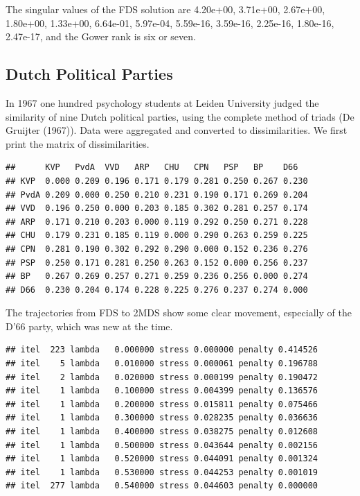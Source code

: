 \documentclass[
  12pt,
]{article}
\begin{document}
The singular values of the FDS solution are 4.20e+00, 3.71e+00,
2.67e+00, 1.80e+00, 1.33e+00, 6.64e-01, 5.97e-04, 5.59e-16, 3.59e-16,
2.25e-16, 1.80e-16, 2.47e-17, and the Gower rank is six or seven.

\hypertarget{dutch-political-parties}{%
\subsection{Dutch Political Parties}\label{dutch-political-parties}}

In 1967 one hundred psychology students at Leiden University judged the
similarity of nine Dutch political parties, using the complete method of
triads (De Gruijter (1967)). Data were aggregated and converted to
dissimilarities. We first print the matrix of dissimilarities.

\begin{verbatim}
##      KVP   PvdA  VVD   ARP   CHU   CPN   PSP   BP    D66  
## KVP  0.000 0.209 0.196 0.171 0.179 0.281 0.250 0.267 0.230
## PvdA 0.209 0.000 0.250 0.210 0.231 0.190 0.171 0.269 0.204
## VVD  0.196 0.250 0.000 0.203 0.185 0.302 0.281 0.257 0.174
## ARP  0.171 0.210 0.203 0.000 0.119 0.292 0.250 0.271 0.228
## CHU  0.179 0.231 0.185 0.119 0.000 0.290 0.263 0.259 0.225
## CPN  0.281 0.190 0.302 0.292 0.290 0.000 0.152 0.236 0.276
## PSP  0.250 0.171 0.281 0.250 0.263 0.152 0.000 0.256 0.237
## BP   0.267 0.269 0.257 0.271 0.259 0.236 0.256 0.000 0.274
## D66  0.230 0.204 0.174 0.228 0.225 0.276 0.237 0.274 0.000
\end{verbatim}

The trajectories from FDS to 2MDS show some clear movement, especially
of the D'66 party, which was new at the time.

\begin{verbatim}
## itel  223 lambda   0.000000 stress 0.000000 penalty 0.414526 
## itel    5 lambda   0.010000 stress 0.000061 penalty 0.196788 
## itel    2 lambda   0.020000 stress 0.000199 penalty 0.190472 
## itel    1 lambda   0.100000 stress 0.004399 penalty 0.136576 
## itel    1 lambda   0.200000 stress 0.015811 penalty 0.075466 
## itel    1 lambda   0.300000 stress 0.028235 penalty 0.036636 
## itel    1 lambda   0.400000 stress 0.038275 penalty 0.012608 
## itel    1 lambda   0.500000 stress 0.043644 penalty 0.002156 
## itel    1 lambda   0.520000 stress 0.044091 penalty 0.001324 
## itel    1 lambda   0.530000 stress 0.044253 penalty 0.001019 
## itel  277 lambda   0.540000 stress 0.044603 penalty 0.000000
\end{verbatim}
\end{document}
